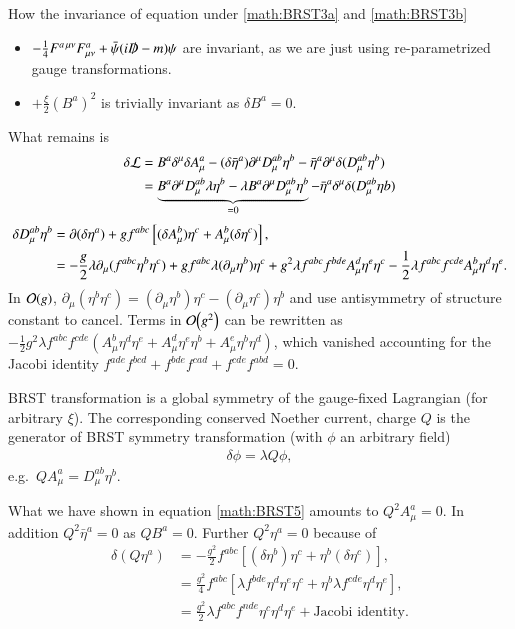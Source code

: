 How the invariance of equation under \ref{math:BRST3a} and \ref{math:BRST3b}
\begin{itemize}
   \item $-\frac{1}{4} F^{a\, \mu\nu} F^a_{\mu\nu} + \bar\psi (i \slashed{D} - m) \psi$ are invariant, as we are just using re-parametrized gauge transformations.
   \item $+ \frac{\xi}{2} (B^a)^2$ is trivially invariant as $\delta B^a = 0$.
\end{itemize}
What remains is
\begin{align}
   \delta \mathcal{L} &= B^a \delta^\mu \delta A^a_\mu -  (\delta \bar \eta^a) \partial^\mu D_\mu^{ab} \eta^b - \bar\eta^a \partial^\mu \delta(D^{ab}_\mu \eta^b)  \notag \\
            &= \underbrace{B^a \partial^\mu D_\mu^{ab} \lambda \eta^b - \lambda B^a \partial^\mu D_\mu^{ab} \eta^b}_{=0} - \bar{\eta}^a \delta^\mu \delta(D_\mu^{ab} \eta b )  \label{math:BRST4}
\end{align}
\begin{align}
   \delta D_\mu^{ab} \eta^b &= \partial(\delta \eta^a) + g f^{abc} \left[ (\delta A_\mu^b) \eta^c + A_\mu^b (\delta \eta^c) \right], \notag \\
                         &= - \frac{g}{2} \lambda \partial_\mu (f^{abc} \eta^b \eta^c ) + g f^{abc} \lambda (\partial_\mu \eta^b) \eta^c + g^2 \lambda f^{abc} f^{bde} A_\mu^d \eta^e \eta^c - \frac{1}{2} \lambda f^{abc} f^{cde} A_\mu^b \eta^d \eta^e \label{math:BRST5}.
\end{align}
In $\order{g}$, $\partial_\mu (\eta^b \eta^c) = (\partial_\mu \eta^b) \eta^c - (\partial_\mu \eta^c) \eta^b$ and use antisymmetry of structure constant to cancel.
Terms in $\order{g^2}$ can be rewritten as
$-\frac{1}{2} g^2 \lambda f^{abc} f^{cde} \left( A_\mu^b \eta^d \eta^e + A_\mu^d \eta^e \eta^b + A_\mu^e \eta^b \eta^d \right)$, which vanished accounting for the Jacobi identity
$f^{ade} f^{bcd} + f^{bde} f^{cad} + f^{cde} f^{abd} = 0 $.

BRST transformation is a global symmetry of the gauge-fixed Lagrangian (for arbitrary $\xi$). The corresponding conserved Noether current, charge $Q$ is the generator of BRST symmetry transformation (with $\phi$ an arbitrary field)
\begin{align*}
   \delta \phi = \lambda Q \phi,
\end{align*}
e.g.~$Q A_\mu^a = D_\mu^{ab} \eta^b$.

What we have shown in equation \ref{math:BRST5} amounts to $Q^2 A_\mu^a = 0$. In addition $Q^2 \bar{\eta}^a = 0$ as $Q B^a = 0$. Further $Q^2 \eta^a = 0$ because of 
\begin{align*}
   \delta  (Q \eta^a) &= - \frac{g^2}{2} f^{abc} \left[ (\delta \eta^b) \eta^c + \eta^b (\delta \eta^c) \right],  \\
                   &= \frac{g^2}{4} f^{abc} \left[ \lambda f^{bde} \eta^d \eta^e \eta^c + \eta^b \lambda f^{cde} \eta^d \eta^e \right], \\
                   &= \frac{g^2}{2} \lambda f^{abc} f^{nde} \eta^c \eta^d \eta^e + \text{Jacobi identity}.
\end{align*}

